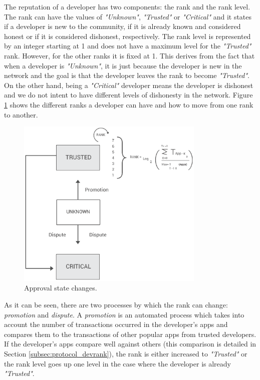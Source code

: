 The reputation of a developer has two components: the rank and the rank level. The rank can have the values of \textit{"Unknown"}, \textit{"Trusted"} or \textit{"Critical"} and it states if a developer is new to the community, if it is already known and considered honest or if it is considered dishonest, respectively. The rank level is represented by an integer starting at 1 and does not have a maximum level for the \textit{"Trusted"} rank. However, for the other ranks it is fixed at 1. This derives from the fact that when a developer is \textit{"Unknown"}, it is just because the developer is new in the network and the goal is that the developer leaves the rank to become \textit{"Trusted"}. On the other hand, being a \textit{"Critical"} developer means the developer is dishonest and we do not intent to have different levels of dishonesty in the network. Figure \ref{fig:approval_state_diagram} shows the different ranks a developer can have and how to move from one rank to another. \\

\begin{figure}[!ht]
\centering
\includegraphics[width=0.8\textwidth]{diagrams/approval_state_diagram.eps}
\caption{Approval state changes.}
\label{fig:approval_state_diagram}
\end{figure}

As it can be seen, there are two processes by which the rank can change: \textit{promotion} and \textit{dispute}. A \textit{promotion} is an automated process which takes into account the number of transactions occurred in the developer's apps and compares them to the transactions of other popular apps from trusted developers. If the developer's apps compare well against others (this comparison is detailed in Section \ref{subsec:protocol_devrank}), the rank is either increased to \textit{"Trusted"} or the rank level goes up one level in the case where the developer is already \textit{"Trusted"}. \\

